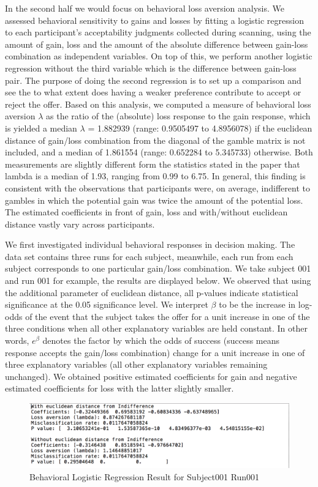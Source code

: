 \par \indent In the second half we would focus on behavioral loss aversion
analysis. We assessed behavioral sensitivity to gains and losses by fitting a
logistic regression to each participant's acceptability judgments collected 
during scanning, using the amount of gain, loss and the amount of the absolute 
difference between gain-loss combination as independent variables. On top of
this, we perform another logistic regression without the third variable which 
is the difference between gain-loss pair. The purpose of doing the second
regression is to set up a comparison and see the to what extent does  having a 
weaker preference contribute to accept or reject the offer. Based on this 
analysis, we computed a measure of behavioral loss aversion $\lambda$ as the ratio
of the (absolute) loss response to the gain response, which is yielded a median
$\lambda$ = 1.882939 (range: 0.9505497 to 4.8956078) if the euclidean distance of 
gain/loss combination from the diagonal of the gamble matrix is not included, 
and a median of 1.861554 (range: 0.652284 to 5.345733) otherwise. Both
measurements are slightly different form the statistics stated in the paper that
lambda is a median of 1.93, ranging from 0.99 to 6.75. In general, this finding
is consistent with the observations that participants were, on average,
indifferent to gambles in which the potential gain was twice the amount of the 
potential loss. The estimated coefficients in front of gain, loss and 
with/without euclidean distance vastly vary across participants. 
    
\par \indent We first investigated individual behavioral responses in decision 
making. The data set contains three runs for each subject, meanwhile, each run 
from each subject corresponds to one particular gain/loss combination. We take 
subject 001 and run 001 for example, the results are displayed below. We
observed that using the additional parameter of euclidean distance, all
p-values indicate statistical significance at the 0.05 significance level. We
interpret $\beta$ to be the increase in log-odds of the event that the subject 
takes the offer for a unit increase in one of the three conditions when all 
other explanatory variables are held constant. In other words, $e^{\beta}$
denotes the factor by which the odds of success (success means response accepts
the gain/loss combination) change for a unit increase in one of three
explanatory variables (all other explanatory variables remaining unchanged). We
obtained positive estimated coefficients for gain and negative estimated
coefficients for loss with the latter slightly smaller. 

\begin {figure}[!ht]
\centering
\includegraphics[width=120mm]{images/Sub001Run001.png}
\caption{Behavioral Logistic Regression Result for Subject001 Run001}
\label{fig:Logistic Regression}
\end{figure}

